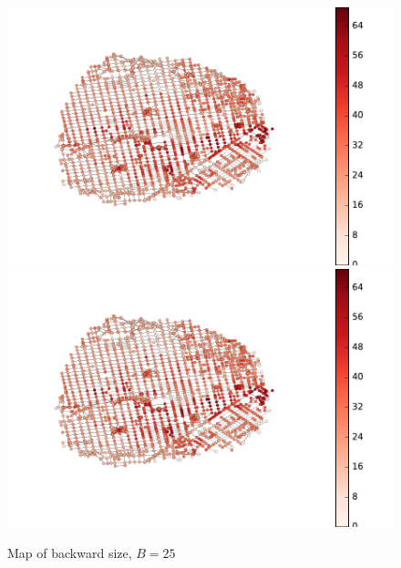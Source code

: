 \begin{figure}
\begin{center}
\includegraphics[clip, trim=1.7cm 2.2cm 4.7cm 1.7cm,scale=0.8]{TexImg/SF_hub_sizes.pdf}
\includegraphics[clip, trim=13cm 0cm 1.1cm 0cm,scale=0.45]{TexImg/SF_hub_sizes.pdf}
\end{center}
\caption{Map of backward size, $B=25$}\label{fig:SF_hub_size_map}
\end{figure}

